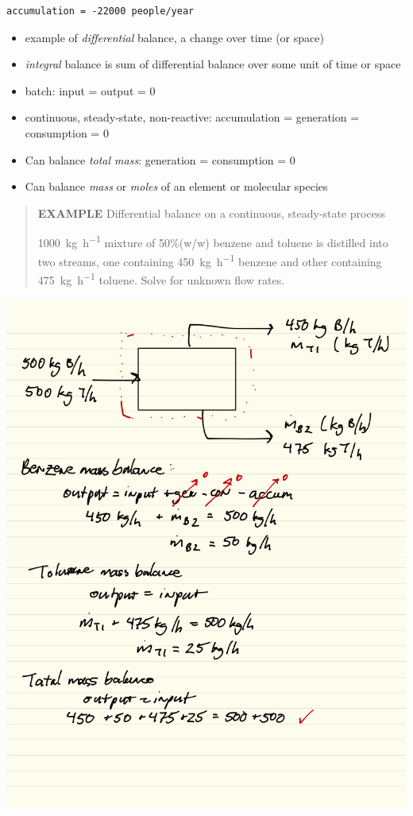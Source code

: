 \documentclass[11pt]{article}
\begin{document}
\begin{verbatim}
accumulation = -22000 people/year
\end{verbatim}

\begin{itemize}
\item example of \emph{differential} balance, a change over time (or space)
\item \emph{integral} balance is sum of differential balance over some unit of time or space

\item batch: input = output = 0
\item continuous, steady-state, non-reactive: accumulation = generation = consumption = 0

\item Can balance \emph{total mass}: generation = consumption = 0
\item Can balance \emph{mass} or \emph{moles} of an element or molecular species
\end{itemize}

\begin{quote}
\textbf{EXAMPLE} Differential balance on a continuous, steady-state process

\SI{1000}{\kilogram\per\hour} mixture of 50\%(w/w) benzene and toluene is distilled into two streams, one containing \SI{450}{\kilogram\per\hour} benzene and other containing \SI{475}{\kilogram\per\hour} toluene.  Solve for unknown flow rates.
\end{quote}

\includegraphics[width=.9\linewidth]{./figs/diff-balance1.png}
\end{document}

